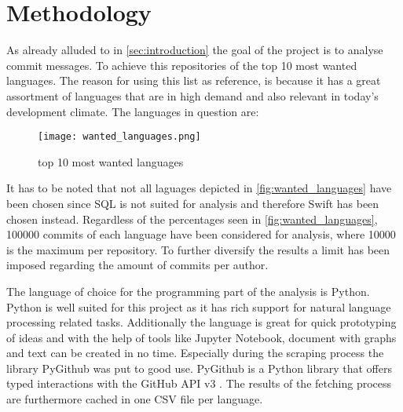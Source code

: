 \section{Methodology}
\label{sec:methodology}

As already alluded to in \autoref{sec:introduction} the goal of the project is to
analyse commit messages. To achieve this repositories of the top 10 most
wanted languages. The reason for using this list as reference, is because it
has a great assortment of languages that are in high demand and also relevant
in today's development climate. The languages in question are:

\begin{figure}[H]
  \centering
  \texttt{[image: wanted\_languages.png]}
  \caption{top 10 most wanted languages \cite{so-survey}}
  \label{fig:wanted_languages}
\end{figure}

It has to be noted that not all laguages depicted in
\autoref{fig:wanted_languages} have been chosen since SQL is not suited for
analysis and therefore Swift has been chosen instead. Regardless of the
percentages seen in \autoref{fig:wanted_languages}, 100000 commits of each
language have been considered for analysis, where 10000 is the maximum per
repository. To further diversify the results a limit has been imposed regarding
the amount of commits per author.

The language of choice for the programming part of the analysis
is Python. Python is well suited for this project as it has rich support for
natural language processing related tasks. Additionally the language is great
for quick prototyping of ideas and with the help of tools like Jupyter
Notebook, document with graphs and text can be created in no time. Especially
during the scraping process the library PyGithub was put to good use. PyGithub
is a Python library that offers typed interactions with the GitHub API v3
\cite{pygithub}. The results of the fetching process are furthermore cached in
one CSV file per language.

